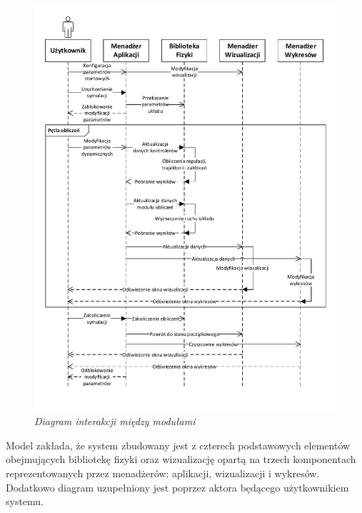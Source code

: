 \documentclass[12pt, twoside, openany]{report}
\theoremstyle{definition}
\begin{document}
\begin{figure}[H]
	\centering
		\includegraphics[width = 400pt]{Interaction} 
		\caption{\textit{Diagram interakcji między modułami}}
		\label{Interaction}
\end{figure}

Model zakłada, że system zbudowany jest z czterech podstawowych elementów obejmujących bibliotekę fizyki oraz wizualizację opartą na trzech komponentach reprezentowanych przez menadżerów: aplikacji, wizualizacji i wykresów. Dodatkowo diagram uzupełniony jest poprzez aktora będącego użytkownikiem systemu. 
\end{document}
